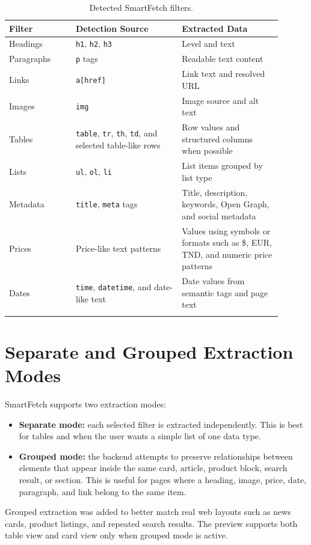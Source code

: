 \documentclass[11pt,a4paper]{article}
\newcommand{\tech}[1]{\texttt{#1}}
\begin{document}
\begin{longtable}{p{0.22\linewidth}p{0.35\linewidth}p{0.33\linewidth}}
\toprule
\textbf{Filter} & \textbf{Detection Source} & \textbf{Extracted Data} \\
\midrule
\endhead
Headings & \tech{h1}, \tech{h2}, \tech{h3} & Level and text \\
Paragraphs & \tech{p} tags & Readable text content \\
Links & \tech{a[href]} & Link text and resolved URL \\
Images & \tech{img} & Image source and alt text \\
Tables & \tech{table}, \tech{tr}, \tech{th}, \tech{td}, and selected table-like rows & Row values and structured columns when possible \\
Lists & \tech{ul}, \tech{ol}, \tech{li} & List items grouped by list type \\
Metadata & \tech{title}, \tech{meta} tags & Title, description, keywords, Open Graph, and social metadata \\
Prices & Price-like text patterns & Values using symbols or formats such as \$, EUR, TND, and numeric price patterns \\
Dates & \tech{time}, \tech{datetime}, and date-like text & Date values from semantic tags and page text \\
\bottomrule
\caption{Detected SmartFetch filters.}
\end{longtable}

\section{Separate and Grouped Extraction Modes}

SmartFetch supports two extraction modes:

\begin{itemize}
  \item \textbf{Separate mode:} each selected filter is extracted independently. This is best for tables and when the user wants a simple list of one data type.
  \item \textbf{Grouped mode:} the backend attempts to preserve relationships between elements that appear inside the same card, article, product block, search result, or section. This is useful for pages where a heading, image, price, date, paragraph, and link belong to the same item.
\end{itemize}

Grouped extraction was added to better match real web layouts such as news cards, product listings, and repeated search results. The preview supports both table view and card view only when grouped mode is active.
\end{document}
